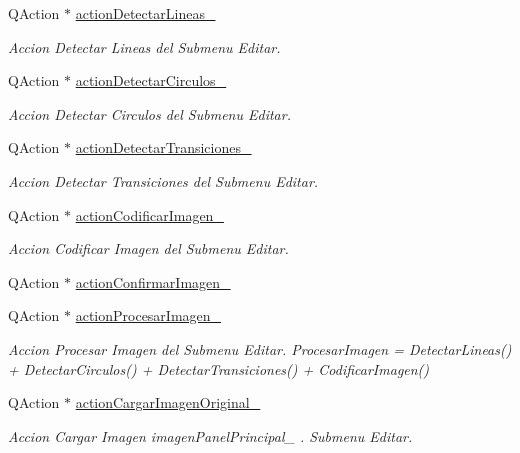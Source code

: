 \begin{DoxyCompactItemize}
Q\+Action $\ast$ \hyperlink{classCAplicacion_a5b6d0af534cc0f64dfb7598faa30f3ae}{action\+Detectar\+Lineas\+\_\+}
\begin{DoxyCompactList}\small\item\em Accion Detectar Lineas del Submenu Editar. \end{DoxyCompactList}\item 
Q\+Action $\ast$ \hyperlink{classCAplicacion_ab4c2fb6ecc5d7c21a1f181f0f0af2830}{action\+Detectar\+Circulos\+\_\+}
\begin{DoxyCompactList}\small\item\em Accion Detectar Circulos del Submenu Editar. \end{DoxyCompactList}\item 
Q\+Action $\ast$ \hyperlink{classCAplicacion_acda82e41d91a94e32bbfa21965338f5a}{action\+Detectar\+Transiciones\+\_\+}
\begin{DoxyCompactList}\small\item\em Accion Detectar Transiciones del Submenu Editar. \end{DoxyCompactList}\item 
Q\+Action $\ast$ \hyperlink{classCAplicacion_a06464c87dd4924cc8bb92f946239f603}{action\+Codificar\+Imagen\+\_\+}
\begin{DoxyCompactList}\small\item\em Accion Codificar Imagen del Submenu Editar. \end{DoxyCompactList}\item 
Q\+Action $\ast$ \hyperlink{classCAplicacion_aa897b20516e31a2992e58f92cd9b4ddf}{action\+Confirmar\+Imagen\+\_\+}
\item 
Q\+Action $\ast$ \hyperlink{classCAplicacion_a9fa952c19f9da356432fae60a40cdced}{action\+Procesar\+Imagen\+\_\+}
\begin{DoxyCompactList}\small\item\em Accion Procesar Imagen del Submenu Editar. Procesar\+Imagen = Detectar\+Lineas() + Detectar\+Circulos() + Detectar\+Transiciones() + Codificar\+Imagen() \end{DoxyCompactList}\item 
Q\+Action $\ast$ \hyperlink{classCAplicacion_a3768f71b55ac5e2d77fed775d8ebce74}{action\+Cargar\+Imagen\+Original\+\_\+}
\begin{DoxyCompactList}\small\item\em Accion Cargar Imagen imagen\+Panel\+Principal\+\_\+ . Submenu Editar. \end{DoxyCompactList}\item 

\end{DoxyCompactItemize}
